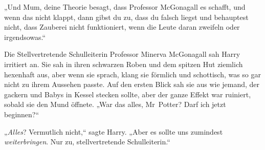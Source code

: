 „Und Mum, deine Theorie besagt, dass Professor McGonagall es schafft, und wenn das nicht klappt, dann gibst du zu, dass du falsch liegst und behauptest nicht, dass Zauberei nicht funktioniert, wenn die Leute daran zweifeln oder irgendsowas.“

Die Stellvertretende Schulleiterin Professor Minerva McGonagall sah Harry irritiert an. Sie sah in ihren schwarzen Roben und dem spitzen Hut ziemlich hexenhaft aus, aber wenn sie sprach, klang sie förmlich und schottisch, was so gar nicht zu ihrem Aussehen passte. Auf den ersten Blick sah sie aus wie jemand, der gackern und Babys in Kessel stecken sollte, aber der ganze Effekt war ruiniert, sobald sie den Mund öffnete. „War das alles, Mr~Potter? Darf ich jetzt beginnen?“

„\emph{Alles}? Vermutlich nicht,“ sagte Harry. „Aber es sollte uns zumindest \emph{weiterbringen}. Nur zu, stellvertretende Schulleiterin.“

